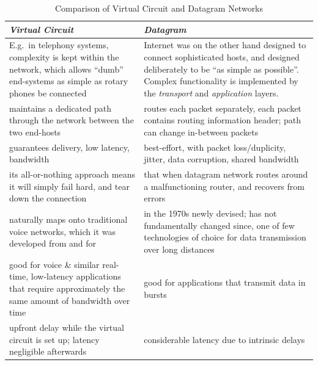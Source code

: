 \documentclass[10pt]{report}
\begin{document}
\begin{table}[h]
  \begin{tabular}{ | p{6cm} | p{6cm} | }
  \hline

  {\em Virtual Circuit}
  	& {\em Datagram} \\ \hline
  \hline

E.g.\ in telephony systems, complexity is kept within the network, which allows ``dumb'' end-systems as simple as rotary phones be connected \cite[p349]{kurose}
	& Internet was on the other hand designed to connect sophisticated
	hosts, and designed deliberately to be ``as simple as possible''.  Complex functionality is implemented by the {\em transport} and {\em application} layers. \cite[pp349--351]{kurose}
	\\ \hline

maintains a dedicated path through the network between the two end-hosts 
	& routes each packet separately, each packet contains routing
	information header; path can change in-between packets \\ \hline

guarantees delivery, low latency, bandwidth
	& best-effort, with packet loss/duplicity, jitter, data corruption,
	shared bandwidth \\ \hline

its all-or-nothing approach means it will simply fail hard, and tear down the
connection
	&  that when datagram network routes around a malfunctioning router,
	and recovers from errors \\ \hline

naturally maps onto traditional voice networks, which it was developed from and
for
	& in the 1970s newly devised; has not fundamentally changed since, one
	of few technologies of choice for data transmission over long distances
	\cite[p298--299]{stallings} \\ \hline

good for voice \& similar real-time, low-latency applications that require
	approximately the same amount of bandwidth over time
	& good for applications that transmit data in bursts \\ \hline

upfront delay while the virtual circuit is set up; latency negligible afterwards
	& considerable latency due to intrinsic delays \\ \hline

  \end{tabular}
  \caption{Comparison of Virtual Circuit and Datagram Networks}
  \label{vcdgcomparison}

\end{table} 
\end{document}
